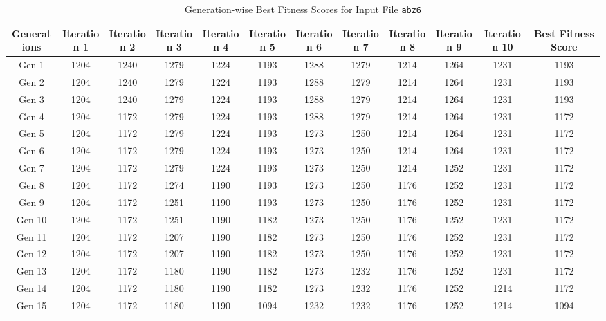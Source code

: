 \documentclass[12pt]{article}
\begin{document}
\begin{table}[h]
    \centering
    \caption{Generation-wise Best Fitness Scores for Input File \texttt{abz6}}
    \label{tab:best_fitness_scores_abz6}
    \begin{adjustbox}{max width=1\textwidth} %
        \begin{tabular}{*{12}{c}}
            \toprule
            Generations & Iteration 1 & Iteration 2 & Iteration 3 & Iteration 4 & Iteration 5 & Iteration 6 & Iteration 7 & Iteration 8 & Iteration 9 & Iteration 10 & Best Fitness Score \\
            \midrule
            Gen 1 & 1204 & 1240 & 1279 & 1224 & 1193 & 1288 & 1279 & 1214 & 1264 & 1231 & 1193 \\
            Gen 2 & 1204 & 1240 & 1279 & 1224 & 1193 & 1288 & 1279 & 1214 & 1264 & 1231 & 1193 \\
            Gen 3 & 1204 & 1240 & 1279 & 1224 & 1193 & 1288 & 1279 & 1214 & 1264 & 1231 & 1193 \\
            Gen 4 & 1204 & 1172 & 1279 & 1224 & 1193 & 1288 & 1279 & 1214 & 1264 & 1231 & 1172 \\
            Gen 5 & 1204 & 1172 & 1279 & 1224 & 1193 & 1273 & 1250 & 1214 & 1264 & 1231 & 1172 \\
            Gen 6 & 1204 & 1172 & 1279 & 1224 & 1193 & 1273 & 1250 & 1214 & 1264 & 1231 & 1172 \\
            Gen 7 & 1204 & 1172 & 1279 & 1224 & 1193 & 1273 & 1250 & 1214 & 1252 & 1231 & 1172 \\
            Gen 8 & 1204 & 1172 & 1274 & 1190 & 1193 & 1273 & 1250 & 1176 & 1252 & 1231 & 1172 \\
            Gen 9 & 1204 & 1172 & 1251 & 1190 & 1193 & 1273 & 1250 & 1176 & 1252 & 1231 & 1172 \\
            Gen 10 & 1204 & 1172 & 1251 & 1190 & 1182 & 1273 & 1250 & 1176 & 1252 & 1231 & 1172 \\
            Gen 11 & 1204 & 1172 & 1207 & 1190 & 1182 & 1273 & 1250 & 1176 & 1252 & 1231 & 1172 \\
            Gen 12 & 1204 & 1172 & 1207 & 1190 & 1182 & 1273 & 1250 & 1176 & 1252 & 1231 & 1172 \\
            Gen 13 & 1204 & 1172 & 1180 & 1190 & 1182 & 1273 & 1232 & 1176 & 1252 & 1231 & 1172 \\
            Gen 14 & 1204 & 1172 & 1180 & 1190 & 1182 & 1273 & 1232 & 1176 & 1252 & 1214 & 1172 \\
            Gen 15 & 1204 & 1172 & 1180 & 1190 & 1094 & 1232 & 1232 & 1176 & 1252 & 1214 & 1094 \\

\end{tabular}
\end{adjustbox}
\end{table}
\end{document}
